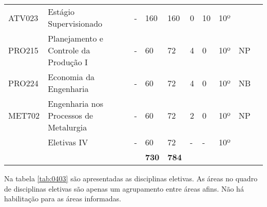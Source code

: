 \begin{table}[]
{\begin{tabular}{l|l|l|l|l|l|l|l|l|l}
			\multicolumn{1}{|l|}{ATV023}                        & {\color[HTML]{6200C9} Estágio Supervisionado}            & {\color[HTML]{6200C9} -}      & {\color[HTML]{6200C9} 160}                                   & {\color[HTML]{6200C9} 160} & {\color[HTML]{6200C9} 0} & {\color[HTML]{6200C9} 10} & {\color[HTML]{6200C9} 10º} & {\color[HTML]{6200C9} } &  \\ \cline{1-9}
			\multicolumn{1}{|l|}{PRO215}                        & Planejamento e Controle da Produção I                    & -                             & 60                                                           & 72                         & 4                        & 0                         & 10º                        & NP                      &  \\ \cline{1-9}
			\multicolumn{1}{|l|}{PRO224}                        & Economia da Engenharia                                   & -                             & 60                                                           & 72                         & 4                        & 0                         & 10º                        & NB                      &  \\ \cline{1-9}
			\multicolumn{1}{|l|}{MET702}                        & Engenharia nos Processos de Metalurgia                   & -                             & 60                                                           & 72                         & 2                        & 0                         & 10º                        & NP                      &  \\ \cline{1-9}
			\multicolumn{1}{|l|}{}                              & {\color[HTML]{009901} Eletivas IV}                       & {\color[HTML]{009901} -}      & {\color[HTML]{009901} 60}                                    & {\color[HTML]{009901} 72}  & {\color[HTML]{009901} -} & {\color[HTML]{009901} -}  & {\color[HTML]{009901} 10º} & {\color[HTML]{009901} } &  \\ \cline{1-9}
			\multicolumn{1}{|l|}{}                              &                                                          &                               & \textbf{730}                                                 & \textbf{784}               &                          &                           &                            &                         &  \\ \cline{1-9}
		\end{tabular}%
	}
\end{table}

Na tabela \ref{tab:0403} são apresentadas as disciplinas eletivas. As áreas no quadro de disciplinas eletivas são apenas um agrupamento entre áreas afins. Não há habilitação para as áreas informadas.

